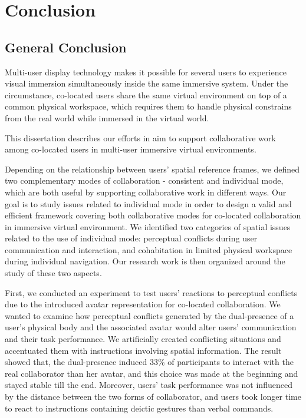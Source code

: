 \chapter*{Conclusion}

\mtcaddchapter[Conclusion]

\section*{General Conclusion}

Multi-user display technology makes it possible for several users to experience visual immersion simultaneously inside the same immersive system. Under the circumstance, co-located users share the same virtual environment on top of a common physical workspace, which requires them to handle physical constrains from the real world while immersed in the virtual world.

This dissertation describes our efforts in aim to support collaborative work among co-located users in multi-user immersive virtual environments.

Depending on the relationship between users' spatial reference frames, we defined two complementary modes of collaboration - consistent and individual mode, which are both useful by supporting collaborative work in different ways. Our goal is to study issues related to individual mode in order to design a valid and efficient framework covering both collaborative modes for co-located collaboration in immersive virtual environment. We identified two categories of spatial issues related to the use of individual mode: perceptual conflicts during user communication and interaction, and cohabitation in limited physical workspace during individual navigation. Our research work is then organized around the study of these two aspects.

First, we conducted an experiment to test users' reactions to perceptual conflicts due to the introduced avatar representation for co-located collaboration. We wanted to examine how perceptual conflicts generated by the dual-presence of a user's physical body and the associated avatar would alter users' communication and their task performance. We artificially created conflicting situations and accentuated them with instructions involving spatial information. The result showed that, the dual-presence induced 33\% of participants to interact with the real collaborator than her avatar, and this choice was made at the beginning and stayed stable till the end. Moreover, users' task performance was not influenced by the distance between the two forms of collaborator, and users took longer time to react to instructions containing deictic gestures than verbal commands.

